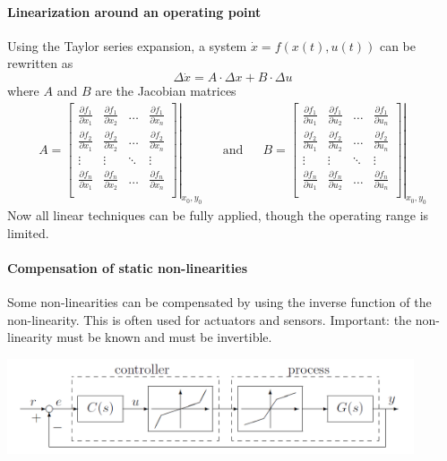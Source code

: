 \paragraph{Linearization around an operating point}
Using the Taylor series expansion, a system $\dot{x} = f(x(t),u(t))$ can be rewritten as
\[
    \Delta\dot{x} = A \cdot \Delta x + B \cdot \Delta u
\]
where $A$ and $B$ are the Jacobian matrices
\begin{align*}
    A = \left.\begin{bmatrix}
        \frac{\partial f_1}{\partial x_1} & \frac{\partial f_1}{\partial x_2} & \dots & \frac{\partial f_1}{\partial x_n} \\
        \frac{\partial f_2}{\partial x_1} & \frac{\partial f_2}{\partial x_2} & \dots & \frac{\partial f_2}{\partial x_n} \\
        \vdots & \vdots & \ddots & \vdots \\
        \frac{\partial f_n}{\partial x_1} & \frac{\partial f_n}{\partial x_2} & \dots & \frac{\partial f_n}{\partial x_n} \\
    \end{bmatrix} \right|_{x_0,y_0}
    && \text{and} &&
    B = \left.\begin{bmatrix}
            \frac{\partial f_1}{\partial u_1} & \frac{\partial f_1}{\partial u_2} & \dots & \frac{\partial f_1}{\partial u_n} \\
            \frac{\partial f_2}{\partial u_1} & \frac{\partial f_2}{\partial u_2} & \dots & \frac{\partial f_2}{\partial u_n} \\
            \vdots & \vdots & \ddots & \vdots \\
            \frac{\partial f_n}{\partial u_1} & \frac{\partial f_n}{\partial u_2} & \dots & \frac{\partial f_n}{\partial u_n} \\
        \end{bmatrix} \right|_{x_0,y_0}
\end{align*}
Now all linear techniques can be fully applied, though the operating range is limited.

\paragraph{Compensation of static non-linearities}
Some non-linearities can be compensated by using the inverse function of the non-linearity.
This is often used for actuators and sensors.
Important: the non-linearity must be known and must be invertible.

\begin{center}
    \includegraphics[width=12cm]{bilder/nonlinear_comp.png}
\end{center}

